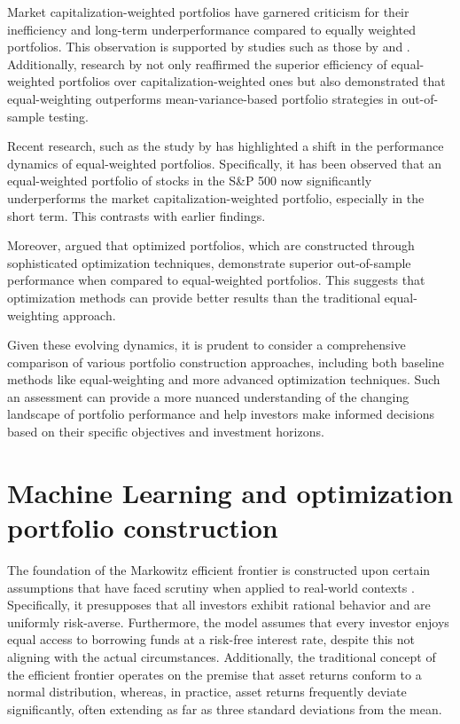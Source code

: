 Market capitalization-weighted portfolios have garnered criticism for their inefficiency and long-term underperformance compared to equally weighted portfolios. This observation is supported by studies such as those by \citep{Bolognesi201314} and \citep{Malladi2017188}. Additionally, research by \citep{DeMiguel20091915} not only reaffirmed the superior efficiency of equal-weighted portfolios over capitalization-weighted ones but also demonstrated that equal-weighting outperforms mean-variance-based portfolio strategies in out-of-sample testing.

Recent research, such as the study by \citep{Taljaard20211855} has highlighted a shift in the performance dynamics of equal-weighted portfolios. Specifically, it has been observed that an equal-weighted portfolio of stocks in the S\&P 500 now significantly underperforms the market capitalization-weighted portfolio, especially in the short term. This contrasts with earlier findings.

Moreover, \citep{Kritzman201031} argued that optimized portfolios, which are constructed through sophisticated optimization techniques, demonstrate superior out-of-sample performance when compared to equal-weighted portfolios. This suggests that optimization methods can provide better results than the traditional equal-weighting approach.

Given these evolving dynamics, it is prudent to consider a comprehensive comparison of various portfolio construction approaches, including both baseline methods like equal-weighting and more advanced optimization techniques. Such an assessment can provide a more nuanced understanding of the changing landscape of portfolio performance and help investors make informed decisions based on their specific objectives and investment horizons.

\section{Machine Learning and optimization portfolio construction}
The foundation of the Markowitz efficient frontier is constructed upon certain assumptions that have faced scrutiny when applied to real-world contexts \citep{Ma2021}. Specifically, it presupposes that all investors exhibit rational behavior and are uniformly risk-averse. Furthermore, the model assumes that every investor enjoys equal access to borrowing funds at a risk-free interest rate, despite this not aligning with the actual circumstances. Additionally, the traditional concept of the efficient frontier operates on the premise that asset returns conform to a normal distribution, whereas, in practice, asset returns frequently deviate significantly, often extending as far as three standard deviations from the mean.

